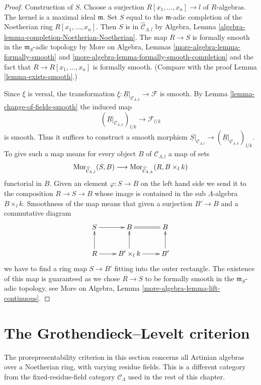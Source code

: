 \begin{proof}
Construction of $S$. Choose a surjection $R[x_1, \ldots, x_n] \to l$
of $R$-algebras. The kernel is a maximal ideal $\mathfrak m$.
Set $S$ equal to the $\mathfrak m$-adic completion of the Noetherian ring
$R[x_1, \ldots, x_n]$. Then $S$ is in $\widehat{\mathcal{C}}_{\Lambda, l}$
by Algebra, Lemma \ref{algebra-lemma-completion-Noetherian-Noetherian}.
The map $R \to S$ is formally smooth in the $\mathfrak m_S$-adic topology by
More on Algebra, Lemmas
\ref{more-algebra-lemma-formally-smooth} and
\ref{more-algebra-lemma-formally-smooth-completion}
and the fact that $R \to R[x_1, \ldots, x_n]$ is formally smooth.
(Compare with the proof Lemma \ref{lemma-exists-smooth}.)

\medskip\noindent
Since $\xi$ is versal, the transformation
$\underline{\xi} : \underline{R}|_{\mathcal{C}_{\Lambda, k}} \to \mathcal{F}$
is smooth. By Lemma \ref{lemma-change-of-fields-smooth} the induced map
$$
(\underline{R}|_{\mathcal{C}_{\Lambda, k}})_{l/k}
\longrightarrow
\mathcal{F}_{l/k}
$$
is smooth. Thus it suffices to construct a smooth morphism
$\underline{S}|_{\mathcal{C}_{\Lambda, l}} \to
(\underline{R}|_{\mathcal{C}_{\Lambda, k}})_{l/k}$.
To give such a map means for every object $B$ of $\mathcal{C}_{\Lambda, l}$
a map of sets
$$
\mathop{\mathrm{Mor}}\nolimits_{\widehat{\mathcal{C}}_{\Lambda, l}}(S, B)
\longrightarrow
\mathop{\mathrm{Mor}}\nolimits_{\widehat{\mathcal{C}}_{\Lambda, k}}(R, B \times_l k)
$$
functorial in $B$. Given an element $\varphi : S \to B$
on the left hand side we send it to the composition $R \to S \to B$
whose image is contained in the sub $\Lambda$-algebra $B \times_l k$.
Smoothness of the map means that given a surjection
$B' \to B$ and a commutative diagram
$$
\xymatrix{
S \ar[r] & B \ar@{=}[r] & B \\
R \ar[u] \ar[r] & B' \times_l k \ar[u] \ar[r] & B' \ar[u]
}
$$
we have to find a ring map $S \to B'$ fitting into the outer rectangle.
The existence of this map is guaranteed as we chose $R \to S$ to be
formally smooth in the $\mathfrak m_S$-adic topology, see
More on Algebra, Lemma \ref{more-algebra-lemma-lift-continuous}.
\end{proof}





\section{The Grothendieck--Levelt criterion}
\label{section-grothendieck-levelt}

\noindent
The prorepresentability criterion in this section concerns all Artinian
algebras over a Noetherian ring, with varying residue fields. This is a
different category from the fixed-residue-field category
$\mathcal{C}_\Lambda$ used in the rest of this chapter.

